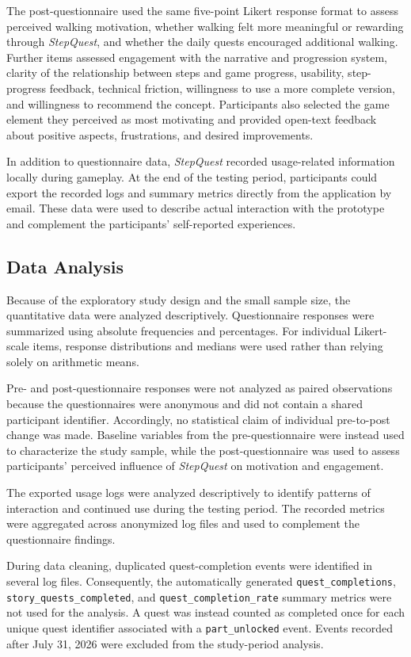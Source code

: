 The post-questionnaire used the same five-point Likert response format to assess perceived walking motivation, whether walking felt more meaningful or rewarding through \textit{StepQuest}, and whether the daily quests encouraged additional walking. Further items assessed engagement with the narrative and progression system, clarity of the relationship between steps and game progress, usability, step-progress feedback, technical friction, willingness to use a more complete version, and willingness to recommend the concept. Participants also selected the game element they perceived as most motivating and provided open-text feedback about positive aspects, frustrations, and desired improvements.

In addition to questionnaire data, \textit{StepQuest} recorded usage-related information locally during gameplay. At the end of the testing period, participants could export the recorded logs and summary metrics directly from the application by email. These data were used to describe actual interaction with the prototype and complement the participants' self-reported experiences.

\subsection{Data Analysis}

Because of the exploratory study design and the small sample size, the quantitative data were analyzed descriptively. Questionnaire responses were summarized using absolute frequencies and percentages. For individual Likert-scale items, response distributions and medians were used rather than relying solely on arithmetic means.

Pre- and post-questionnaire responses were not analyzed as paired observations because the questionnaires were anonymous and did not contain a shared participant identifier. Accordingly, no statistical claim of individual pre-to-post change was made. Baseline variables from the pre-questionnaire were instead used to characterize the study sample, while the post-questionnaire was used to assess participants' perceived influence of \textit{StepQuest} on motivation and engagement.

The exported usage logs were analyzed descriptively to identify patterns of interaction and continued use during the testing period. The recorded metrics were aggregated across anonymized log files and used to complement the questionnaire findings.

During data cleaning, duplicated quest-completion events were identified in
several log files. Consequently, the automatically generated
\texttt{quest\_completions}, \texttt{story\_quests\_completed}, and
\texttt{quest\_completion\_rate} summary metrics were not used for the
analysis. A quest was instead counted as completed once for each unique
quest identifier associated with a \texttt{part\_unlocked} event. Events
recorded after July 31, 2026 were excluded from the study-period analysis.

